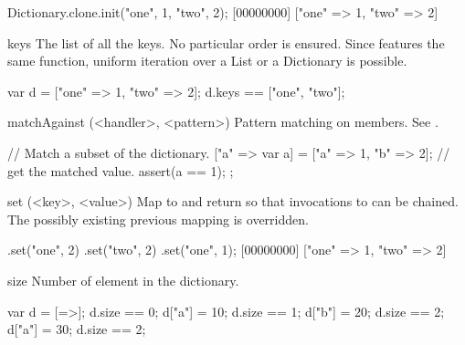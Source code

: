 \begin{urbiscriptapi}
\begin{urbiscript}
Dictionary.clone.init("one", 1, "two", 2);
[00000000] ["one" => 1, "two" => 2]
\end{urbiscript}


\item[keys]%
  The list of all the keys.  No particular order is ensured.  Since
   features the same function, uniform iteration over
  a List or a Dictionary is possible.
\begin{urbiassert}
var d = ["one" => 1, "two" => 2];
d.keys == ["one", "two"];
\end{urbiassert}


\item[matchAgainst](<handler>, <pattern>)
  Pattern matching on members.  See .

\begin{urbiscript}
{
  // Match a subset of the dictionary.
  ["a" => var a] = ["a" => 1, "b" => 2];
  // get the matched value.
  assert(a == 1);
};
\end{urbiscript}


\item[set](<key>, <value>)%
  Map  to  and return \this so that invocations to
   can be chained.  The possibly existing previous mapping is
  overridden.

\begin{urbiscript}
[=>].set("one", 2)
    .set("two", 2)
    .set("one", 1);
[00000000] ["one" => 1, "two" => 2]
\end{urbiscript}


\item[size]
  Number of element in the dictionary.

\begin{urbiassert}
var d = [=>];  d.size == 0;
d["a"] = 10;   d.size == 1;
d["b"] = 20;   d.size == 2;
d["a"] = 30;   d.size == 2;
\end{urbiassert}
\end{urbiscriptapi}


